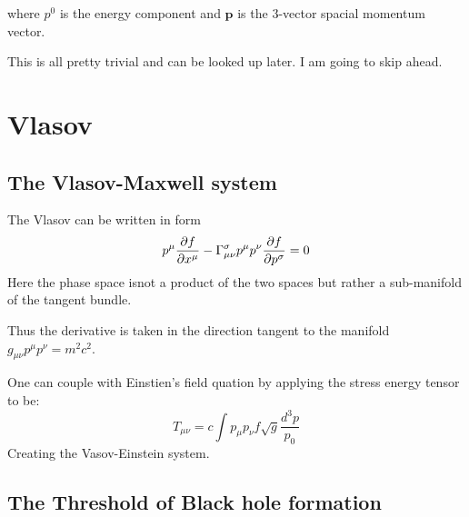   where $p^0$ is the energy component and $\mathbf{p}$ is the 3-vector spacial momentum vector.


This is all pretty trivial and can be looked up later. I am going to skip ahead.

\section{Vlasov}

\subsection{The Vlasov-Maxwell system}

The Vlasov can be written in form
\[
p^\mu \pdv{f}{x^\mu} - \Gamma^\sigma_{\mu \nu}p^\mu p^\nu \pdv{f}{p^\sigma} = 0
  \]
  Here the phase space isnot a product of the two spaces but rather a sub-manifold of the tangent bundle.

  Thus the derivative is taken in the direction tangent to the manifold $g_{\mu \nu}p^\mu p^\nu = m^2 c^2$.

One can couple with Einstien's field quation by applying the stress energy tensor to be:
\[
T_{\mu \nu} = c \int p_\mu p_\nu f \sqrt{g} \frac{d^3p}{p_0}
  \]
  Creating the Vasov-Einstein system.

  \subsection{The Threshold of Black hole formation}

